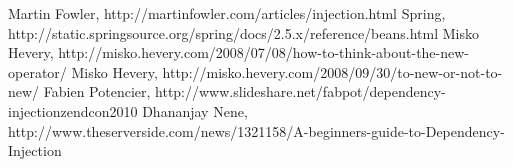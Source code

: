 \documentclass[a4paper,conference]{IEEEtran}
\begin{document}

%
%
%
\begin{thebibliography}{1}

Martin Fowler, http://martinfowler.com/articles/injection.html
Spring, http://static.springsource.org/spring/docs/2.5.x/reference/beans.html
Misko Hevery, http://misko.hevery.com/2008/07/08/how-to-think-about-the-new-operator/
Misko Hevery, http://misko.hevery.com/2008/09/30/to-new-or-not-to-new/
Fabien Potencier, http://www.slideshare.net/fabpot/dependency-injectionzendcon2010
Dhananjay Nene, http://www.theserverside.com/news/1321158/A-beginners-guide-to-Dependency-Injection

\end{thebibliography}




\end{document}
